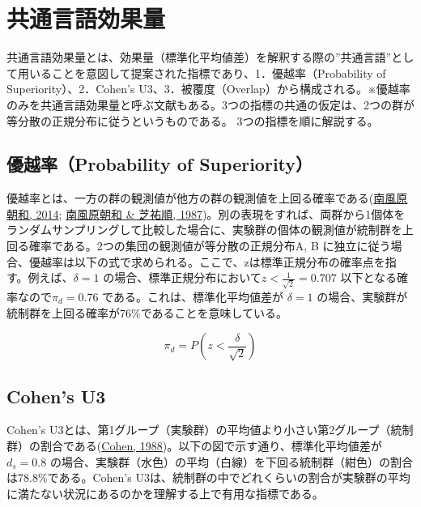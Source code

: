 \documentclass[
  ja=standard, xelatex, base=12pt]{bxjsreport}
\begin{document}
\hypertarget{ux5171ux901aux8a00ux8a9eux52b9ux679cux91cf}{%
\section{共通言語効果量}\label{ux5171ux901aux8a00ux8a9eux52b9ux679cux91cf}}

共通言語効果量とは、効果量（標準化平均値差）を解釈する際の''共通言語''として用いることを意図して提案された指標であり、1．優越率（Probability of Superiority）、2．Cohen's U3、3．被覆度（Overlap）から構成される。※優越率のみを共通言語効果量と呼ぶ文献もある。3つの指標の共通の仮定は、2つの群が等分散の正規分布に従うというものである。 3つの指標を順に解説する。

\hypertarget{ux512aux8d8aux7387probability-of-superiority}{%
\subsection{優越率（Probability of Superiority）}\label{ux512aux8d8aux7387probability-of-superiority}}

優越率とは、一方の群の観測値が他方の群の観測値を上回る確率である(\protect\hyperlink{ref-haebara2014}{南風原朝和, 2014}; \protect\hyperlink{ref-haebara1987}{南風原朝和 \& 芝祐順, 1987})。別の表現をすれば、両群から1個体をランダムサンプリングして比較した場合に、実験群の個体の観測値が統制群を上回る確率である。2つの集団の観測値が等分散の正規分布A, B に独立に従う場合、優越率は以下の式で求められる。ここで、zは標準正規分布の確率点を指す。例えば、\(\delta=1\) の場合、標準正規分布において\(z<\frac{1}{\sqrt{2}}=0.707\) 以下となる確率なので\(\pi_d=0.76\) である。これは、標準化平均値差が \(\delta=1\) の場合、実験群が統制群を上回る確率が76\%であることを意味している。

\[
\pi_d=P(z<\frac{\delta}{\sqrt{2}})
\]

\hypertarget{cohens-u3}{%
\subsection{Cohen's U3}\label{cohens-u3}}

Cohen's U3とは、第1グループ（実験群）の平均値より小さい第2グループ（統制群）の割合である(\protect\hyperlink{ref-cohen1988}{Cohen, 1988})。以下の図で示す通り、標準化平均値差が \(d_s=0.8\) の場合、実験群（水色）の平均（白線）を下回る統制群（紺色）の割合は78.8\%である。Cohen's U3は、統制群の中でどれくらいの割合が実験群の平均に満たない状況にあるのかを理解する上で有用な指標である。
\end{document}

